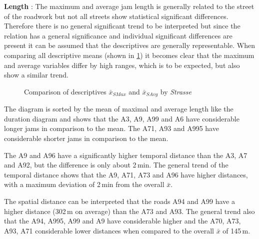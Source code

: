 \textbf{Length} : The maximum and average jam length is generally related to the street of the roadwork but not all streets show statistical significant differences. Therefore there is no general significant trend to be interpreted but since the relation has a general significance and individual significant differences are present it can be assumed that the descriptives are generally representable. When comparing all descriptive means (shown in \cref{fig:arbis_summary_Str_spatial}) it becomes clear that the maximum and average variables differ by high ranges, which is to be expected, but also show a similar trend.
\begin{figure}[ht!]
	\data
	\pgfplotstablesort[sort key=means, sort cmp=float >]{\datasorted}{\data}
	\tiny
	\centering
	\caption{Comparison of descriptives $\bar{x}_{SMax}$ and $\bar{x}_{SAvg}$ by \textit{Strasse}}
	\label{fig:arbis_summary_Str_spatial}
\end{figure}
The diagram is sorted by the mean of maximal and average length like the duration diagram and shows that the A3, A9, A99 and A6 have considerable longer jams in comparison to the mean. The A71, A93 and A995 have considerable shorter jams in comparison to the mean.

The A9 and A96 have a significantly higher temporal distance than the A3, A7 and A92, but the difference is only about 2\,min. The general trend of the temporal distance shows that the A9, A71, A73 and A96 have higher distances, with a maximum deviation of 2\,min from the overall $\bar{x}$.

The spatial distance can be interpreted that the roads A94 and A99 have a higher distance (302\,m on average) than the A73 and A93. The general trend also that the A94, A995, A99 and A9 have considerable higher and the A70, A73, A93, A71 considerable lower distances when compared to the overall $\bar{x}$ of 145\,m.

